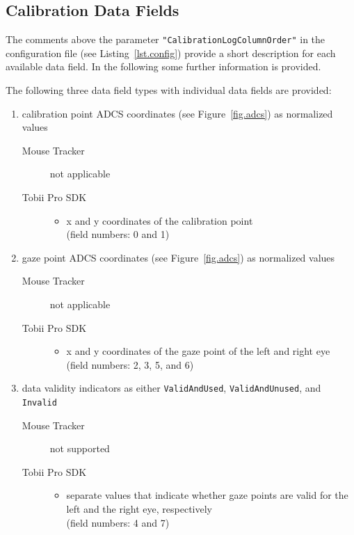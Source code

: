 \documentclass[a4paper,oneside]{book}
\begin{document}
\subsection{Calibration Data Fields}
The comments above the parameter \texttt{"CalibrationLogColumnOrder"} in the configuration file (see Listing~\ref{lst.config}) provide a short description for each available data field.
In the following some further information is provided.

The following three data field types with individual data fields are provided:
\begin{enumerate}
    \item calibration point ADCS coordinates (see Figure~\ref{fig.adcs}) as normalized values
        \begin{description}
            \item[Mouse Tracker] not applicable
            \item[Tobii Pro SDK] \hfill
                \begin{itemize}
                    \item x and y coordinates of the calibration point\\
                        (field numbers: 0 and 1)
                \end{itemize}
        \end{description}
    \item gaze point ADCS coordinates (see Figure~\ref{fig.adcs}) as normalized values
        \begin{description}
            \item[Mouse Tracker] not applicable
            \item[Tobii Pro SDK] \hfill
                \begin{itemize}
                    \item x and y coordinates of the gaze point of the left and right eye\\
                        (field numbers: 2, 3, 5, and 6)
                \end{itemize}
        \end{description}
    \item data validity indicators as either \texttt{ValidAndUsed}, \texttt{ValidAndUnused}, and \texttt{Invalid}
        \begin{description}
            \item[Mouse Tracker] not supported
            \item[Tobii Pro SDK] \hfill
                \begin{itemize}
                    \item separate values that indicate whether gaze points are valid for the left and the right eye, respectively\\
                        (field numbers: 4 and 7)
                \end{itemize}
        \end{description}
\end{enumerate}
\end{document}
